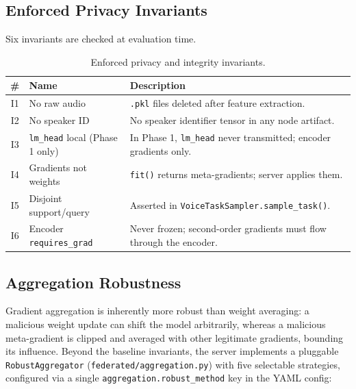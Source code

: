 \documentclass[12pt]{article}
\theoremstyle{plain}
\begin{document}
\subsection{Enforced Privacy Invariants}

Six invariants are checked at evaluation time.

\begin{table}[H]
\centering
\caption{Enforced privacy and integrity invariants.}
\label{tab:invariants}
\begin{tabular}{cp{2.8cm} p{7.5cm}}
\toprule
\textbf{\#} & \textbf{Name} & \textbf{Description} \\
\midrule
I1 & No raw audio & \texttt{.pkl} files deleted after feature extraction. \\
I2 & No speaker ID & No speaker identifier tensor in any node artifact. \\
I3 & \texttt{lm\_head} local (Phase 1 only) &
     In Phase 1, \texttt{lm\_head} never transmitted; encoder gradients only. \\
I4 & Gradients not weights & \texttt{fit()} returns meta-gradients; server applies them. \\
I5 & Disjoint support/query & Asserted in \texttt{VoiceTaskSampler.sample\_task()}. \\
I6 & Encoder \texttt{requires\_grad} &
     Never frozen; second-order gradients must flow through the encoder. \\
\bottomrule
\end{tabular}
\end{table}

\subsection{Aggregation Robustness}

Gradient aggregation is inherently more robust than weight averaging: a malicious weight
update can shift the model arbitrarily, whereas a malicious meta-gradient is clipped and
averaged with other legitimate gradients, bounding its influence.
Beyond the baseline invariants, the server implements a pluggable
\texttt{RobustAggregator} (\texttt{federated/aggregation.py}) with five selectable
strategies, configured via a single \texttt{aggregation.robust\_method} key in the
YAML config:
\end{document}

